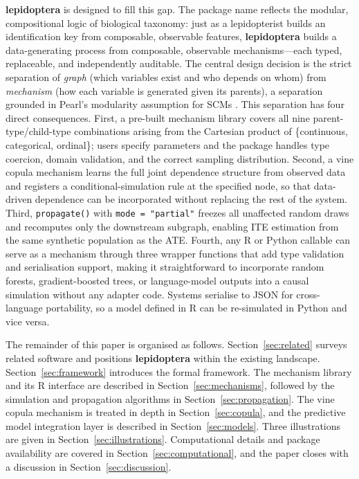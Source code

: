 \documentclass[12pt]{article}
\newcommand{\pkg}[1]{\textbf{#1}}
\newcommand{\proglang}[1]{\textsf{#1}}
\newcommand{\code}[1]{\texttt{#1}}
\newcommand{\fct}[1]{\texttt{#1()}}
\begin{document}
\pkg{lepidoptera} is designed to fill this gap. The package name reflects the
modular, compositional logic of biological taxonomy: just as a lepidopterist builds
an identification key from composable, observable features, \pkg{lepidoptera}
builds a data-generating process from composable, observable mechanisms---each
typed, replaceable, and independently auditable. The central design decision is
the strict separation of \emph{graph} (which variables exist and who depends on
whom) from \emph{mechanism} (how each variable is generated given its parents), a
separation grounded in Pearl's modularity assumption for SCMs
\citep{pearl2009causality, peters2017elements}. This separation has
four direct consequences. First, a pre-built mechanism library covers all nine
parent-type/child-type combinations arising from the Cartesian product of
\{continuous, categorical, ordinal\}; users specify parameters and the package
handles type coercion, domain validation, and the correct sampling distribution.
Second, a vine copula mechanism learns the full joint dependence structure from
observed data and registers a conditional-simulation rule at the specified node,
so that data-driven dependence can be incorporated without replacing the rest of
the system. Third, \fct{propagate} with \code{mode = "partial"} freezes all
unaffected random draws and recomputes only the downstream subgraph, enabling ITE
estimation from the same synthetic population as the ATE. Fourth, any
\proglang{R} or \proglang{Python} callable can serve as a mechanism through three
wrapper functions that add type validation and serialisation support, making it
straightforward to incorporate random forests, gradient-boosted trees, or
language-model outputs into a causal simulation without any adapter code. Systems
serialise to JSON for cross-language portability, so a model defined in \proglang{R}
can be re-simulated in \proglang{Python} and vice versa.

The remainder of this paper is organised as follows. Section~\ref{sec:related}
surveys related software and positions \pkg{lepidoptera} within the existing
landscape. Section~\ref{sec:framework} introduces the formal framework. The
mechanism library and its \proglang{R} interface are described in
Section~\ref{sec:mechanisms}, followed by the simulation and propagation
algorithms in Section~\ref{sec:propagation}. The vine copula mechanism is treated
in depth in Section~\ref{sec:copula}, and the predictive model integration layer is
described in Section~\ref{sec:models}. Three illustrations are given in
Section~\ref{sec:illustrations}. Computational details and package availability
are covered in Section~\ref{sec:computational}, and the paper closes with a
discussion in Section~\ref{sec:discussion}.
\end{document}

